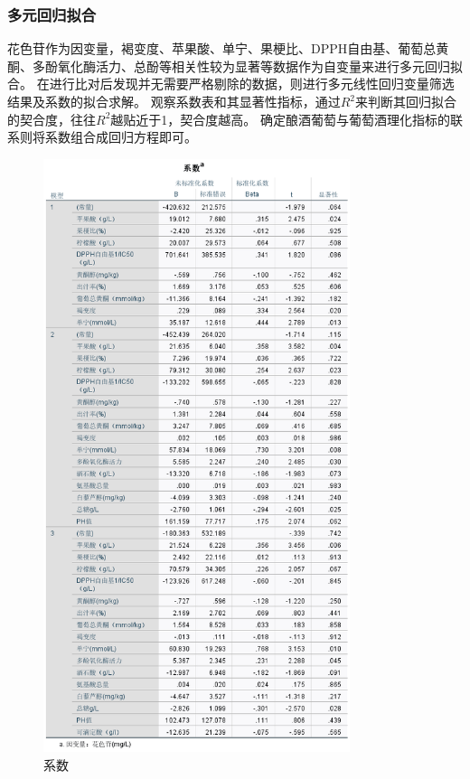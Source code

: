 \documentclass[UTF8]{ctexart}
\begin{document}
							\subsubsection{多元回归拟合}
							花色苷作为因变量，褐变度、苹果酸、单宁、果梗比、DPPH自由基、葡萄总黄酮、多酚氧化酶活力、总酚等相关性较为显著等数据作为自变量来进行多元回归拟合。
							在进行比对后发现并无需要严格剔除的数据，则进行多元线性回归变量筛选结果及系数的拟合求解。
							观察系数表和其显著性指标，通过${R^2}$来判断其回归拟合的契合度，往往${R^2}$越贴近于1，契合度越高。
							确定酿酒葡萄与葡萄酒理化指标的联系则将系数组合成回归方程即可。
							

								\begin{figure}[H]\centering
									\includegraphics[width=0.8\textwidth,height=1.07\textwidth]{img/系数表.png} %
									\caption{系数} %
									\label{fig:figure 8} %
									\end{figure}
								
\end{document}

